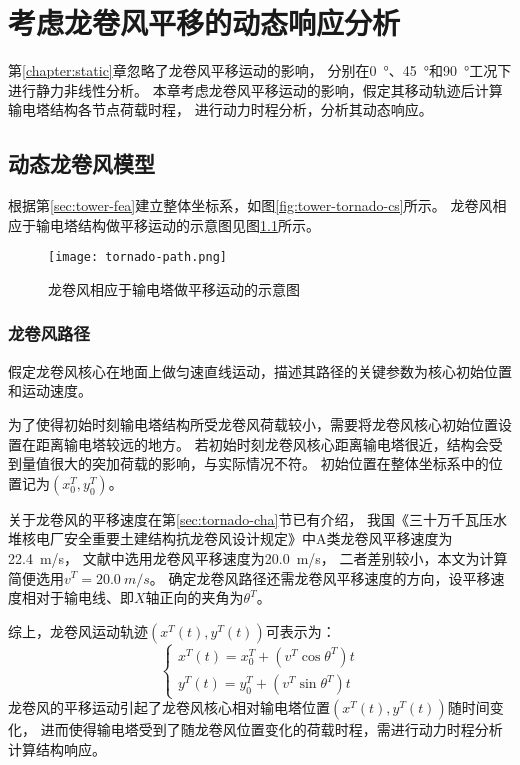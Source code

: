 \graphicspath{{figures/dynamic/}}

\chapter{考虑龙卷风平移的动态响应分析}

第\ref{chapter:static}章忽略了龙卷风平移运动的影响，
分别在\SI{0}{\degree}、\SI{45}{\degree}和\SI{90}{\degree}工况下进行静力非线性分析。
本章考虑龙卷风平移运动的影响，假定其移动轨迹后计算输电塔结构各节点荷载时程，
进行动力时程分析，分析其动态响应。

\section{动态龙卷风模型}

根据第\ref{sec:tower-fea}建立整体坐标系，如图\ref{fig:tower-tornado-cs}所示。
龙卷风相应于输电塔结构做平移运动的示意图见图\ref{fig:tornado-path}所示。
\begin{figure}[!htpb]
	\centering
	\texttt{[image: tornado-path.png]}
	\caption{龙卷风相应于输电塔做平移运动的示意图}
	\label{fig:tornado-path}
\end{figure}

\subsection{龙卷风路径}

假定龙卷风核心在地面上做匀速直线运动，描述其路径的关键参数为核心初始位置和运动速度。

为了使得初始时刻输电塔结构所受龙卷风荷载较小，需要将龙卷风核心初始位置设置在距离输电塔较远的地方。
若初始时刻龙卷风核心距离输电塔很近，结构会受到量值很大的突加荷载的影响，与实际情况不符。
初始位置在整体坐标系中的位置记为$\left(x^T_{0},y^T_{0}\right)$。

关于龙卷风的平移速度在第\ref{sec:tornado-cha}节已有介绍，
我国《三十万千瓦压水堆核电厂安全重要土建结构抗龙卷风设计规定》中A类龙卷风平移速度为\SI{22.4}{m/s}，
文献\cite{savory2001modelling}\cite{hamada2011behaviour}中选用龙卷风平移速度为\SI{20.0}{m/s}，
二者差别较小，本文为计算简便选用$v^T=\SI{20.0}{m/s}$。
确定龙卷风路径还需龙卷风平移速度的方向，设平移速度相对于输电线、即$X$轴正向的夹角为$\theta^T$。

综上，龙卷风运动轨迹$\left(x^T(t),y^T(t)\right)$可表示为：
\begin{equation}
	\begin{cases}
		x^T(t) = x^T_0 + \left(v^T\cos{\theta^T}\right)t \\
		y^T(t) = y^T_0 + \left(v^T\sin{\theta^T}\right)t 
	\end{cases}
\end{equation}
龙卷风的平移运动引起了龙卷风核心相对输电塔位置$\left(x^T(t),y^T(t)\right)$随时间变化，
进而使得输电塔受到了随龙卷风位置变化的荷载时程，需进行动力时程分析计算结构响应。

